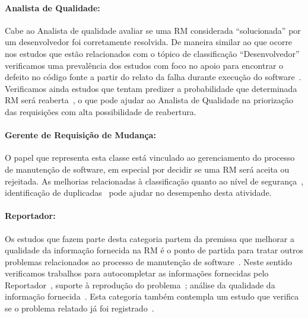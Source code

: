 \paragraph{Analista de Qualidade:}

Cabe ao Analista de qualidade avaliar se uma RM considerada ``solucionada'' por
um desenvolvedor foi corretamente resolvida. De maneira similar ao que ocorre
nos estudos que estão relacionados com o tópico de classificação
``Desenvolvedor'' verificamos uma prevalência dos estudos com foco no apoio para
encontrar o defeito no código fonte a partir do relato da falha durante execução
do software~\cite{corley2011recovering,Wong:2014:BBF:2705615.2706096,
    Thung:2014:BIT:2635868.2661678,Nguyen:2012:MAR:2393596.2393671,thung2013automatic,
    Romo:2015:TAT:2745802.2745833}. Verificamos ainda estudos que tentam
predizer a probabilidade que determinada RM será
reaberta~\cite{xia2015automatic}, o que pode ajudar ao Analista de Qualidade na
priorização das requisições com alta possibilidade de reabertura.

\paragraph{Gerente de Requisição de	Mudança:}

O papel que representa esta classe está vinculado ao gerenciamento do processo
de manutenção de software, em especial por decidir se uma RM será aceita ou
rejeitada. As melhorias relacionadas à classificação quanto ao
nível de segurança~\cite{gegick2010identifying, zhang2011bug,
    ValdiviaGarcia:2014:CPB:2597073.2597099}, identificação de
duplicadas~\cite{hindle2016contextual, sun2010discriminative,
    alipour2013contextual, banerjee2012automated} pode ajudar no desempenho
desta atividade.

\paragraph{Reportador:}

Os estudos que fazem parte desta categoria  partem da premissa que melhorar a
qualidade da informação fornecida na RM é o ponto de partida para tratar outros
problemas relacionados ao processo de manutenção de
software~\cite{moran2015auto, Moran:2015:EAA:2786805.2807557,
    bettenburg2008makes}.  Neste sentido verificamos trabalhos para
autocompletar as informações fornecidas pelo Reportador~\cite{moran2015auto},
suporte à reprodução do problema~\cite{Moran:2015:EAA:2786805.2807557}; análise
da qualidade da informação fornecida~\cite{bettenburg2008makes,
    Tu:2014:MQI:2677832.2677844}.  Esta categoria também contempla um estudo que
verifica se o problema relatado já foi registrado~\cite{Thung2014}.

